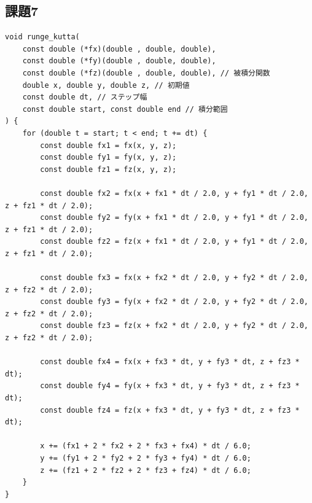 \documentclass[a4j, titlepage]{jsarticle}
\numberwithin{equation}{section}
\begin{document}
    \subsection{課題7}
        \begin{lstlisting}[caption=4次ルンゲ・クッタ法によるローレンツ方程式の数値計算]
void runge_kutta(
    const double (*fx)(double , double, double),
    const double (*fy)(double , double, double),
    const double (*fz)(double , double, double), // 被積分関数
    double x, double y, double z, // 初期値
    const double dt, // ステップ幅
    const double start, const double end // 積分範囲
) {
    for (double t = start; t < end; t += dt) {
        const double fx1 = fx(x, y, z);
        const double fy1 = fy(x, y, z);
        const double fz1 = fz(x, y, z);

        const double fx2 = fx(x + fx1 * dt / 2.0, y + fy1 * dt / 2.0, z + fz1 * dt / 2.0);
        const double fy2 = fy(x + fx1 * dt / 2.0, y + fy1 * dt / 2.0, z + fz1 * dt / 2.0);
        const double fz2 = fz(x + fx1 * dt / 2.0, y + fy1 * dt / 2.0, z + fz1 * dt / 2.0);

        const double fx3 = fx(x + fx2 * dt / 2.0, y + fy2 * dt / 2.0, z + fz2 * dt / 2.0);
        const double fy3 = fy(x + fx2 * dt / 2.0, y + fy2 * dt / 2.0, z + fz2 * dt / 2.0);
        const double fz3 = fz(x + fx2 * dt / 2.0, y + fy2 * dt / 2.0, z + fz2 * dt / 2.0);

        const double fx4 = fx(x + fx3 * dt, y + fy3 * dt, z + fz3 * dt);
        const double fy4 = fy(x + fx3 * dt, y + fy3 * dt, z + fz3 * dt);
        const double fz4 = fz(x + fx3 * dt, y + fy3 * dt, z + fz3 * dt);

        x += (fx1 + 2 * fx2 + 2 * fx3 + fx4) * dt / 6.0;
        y += (fy1 + 2 * fy2 + 2 * fy3 + fy4) * dt / 6.0;
        z += (fz1 + 2 * fz2 + 2 * fz3 + fz4) * dt / 6.0;   
    }
}
        \end{lstlisting}
\end{document}
